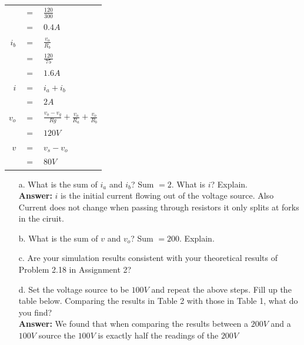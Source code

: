 \documentclass[a4paper]{article}
\begin{document}
\begin{itemize}
\begin{tabular}{rcl}
	      	        & $=$ & $\frac{120}{300}$                                                        \\
	      	        & $=$ & $0.4A$                                                                   \\
	      	$i_{b}$ & $=$ & $\frac{v_{o}}{R_{b}}$                                                    \\
	      	        & $=$ & $\frac{120}{75}$                                                         \\
	      	        & $=$ & $1.6A$                                                                   \\
	      	$i$     & $=$ & $i_{a} + i_{b}$                                                          \\
	      	        & $=$ & $2A$                                                                     \\
	      	$v_{o}$ & $=$ & $\frac{v_{o} - v_{g}}{R{g}} + \frac{v_{o}}{R_{a}} + \frac{v_{o}}{R_{b}}$ \\
	      	        & $=$ & $120V$                                                                   \\
	      	$v$     & $=$ & $v_{s} - v_{o}$                                                          \\
	      	        & $=$ & $80V$                                                                    \\
	      \end{tabular}
	      \begin{itemize}
	      	\item[a.] What is the sum of $i_{a}$ and $i_{b}$? Sum $= 2$. What is $i$? Explain. \\
	      	      \textbf{Answer:} $i$ is the initial current flowing out of the voltage source. Also Current does not change when passing through resistors it only splits at forks in the ciruit.
	      	\item[b.] What is the sum of $v$ and $v_{o}$? Sum $= 200$. Explain.
	      	\item[c.] Are your simulation results consistent with your theoretical results of Problem 2.18 in Assignment 2?
	      	\item[d.] Set the voltage source to be $100 V$ and repeat the above steps. Fill up the table below. Comparing the results in Table 2 with those in Table 1, what do you find? \\
	      	      \textbf{Answer:} We found that when comparing the results between a $200V$ and a $100V$ source the $100V$ is exactly half the readings of the $200V$   

\end{itemize}
\end{itemize}
\end{document}
